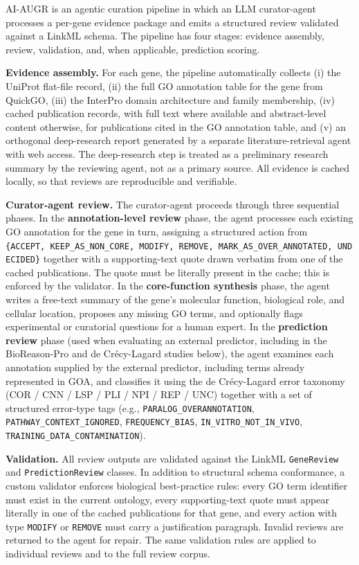 \documentclass[
  11pt,
]{article}
\begin{document}
AI-AUGR is an agentic curation pipeline in which an LLM curator-agent
processes a per-gene evidence package and emits a structured review
validated against a LinkML schema. The pipeline has four stages:
evidence assembly, review, validation, and, when applicable, prediction
scoring.

\textbf{Evidence assembly.} For each gene, the pipeline automatically
collects (i) the UniProt flat-file record, (ii) the full GO annotation
table for the gene from QuickGO, (iii) the InterPro domain architecture
and family membership, (iv) cached publication records, with full text
where available and abstract-level content otherwise, for publications
cited in the GO annotation table, and (v) an orthogonal
deep-research report generated by a separate literature-retrieval agent
with web access. The deep-research step is treated as a preliminary
research summary by the reviewing agent, not as a primary source. All
evidence is cached locally, so that reviews are reproducible and
verifiable.

\textbf{Curator-agent review.} The curator-agent proceeds through three
sequential phases. In the \textbf{annotation-level review} phase, the
agent processes each existing GO annotation for the gene in turn,
assigning a structured action from
\texttt{\{ACCEPT,\ KEEP\_AS\_NON\_CORE,\ MODIFY,\ REMOVE,\ MARK\_AS\_OVER\_ANNOTATED,\ UNDECIDED\}}
together with a supporting-text quote drawn verbatim from one of the
cached publications. The quote must be literally present in the cache;
this is enforced by the validator. In the \textbf{core-function
synthesis} phase, the agent writes a free-text summary of the gene's
molecular function, biological role, and cellular location, proposes any
missing GO terms, and optionally flags experimental or curatorial
questions for a human expert. In the \textbf{prediction review} phase
(used when evaluating an external predictor, including in the
BioReason-Pro and de Crécy-Lagard studies below), the agent examines
each annotation supplied by the external predictor, including terms
already represented in GOA, and
classifies it using the de Crécy-Lagard error taxonomy (COR / CNN / LSP
/ PLI / NPI / REP / UNC) together with a set of structured error-type
tags (e.g., \texttt{PARALOG\_OVERANNOTATION},
\texttt{PATHWAY\_CONTEXT\_IGNORED}, \texttt{FREQUENCY\_BIAS},
\texttt{IN\_VITRO\_NOT\_IN\_VIVO},
\texttt{TRAINING\_DATA\_CONTAMINATION}).

\textbf{Validation.} All review outputs are validated against the LinkML
\texttt{GeneReview} and \texttt{PredictionReview} classes. In addition
to structural schema conformance, a custom validator enforces biological
best-practice rules: every GO term identifier must exist in the current
ontology, every supporting-text quote must appear literally in one of
the cached publications for that gene, and every action with type
\texttt{MODIFY} or \texttt{REMOVE} must carry a justification paragraph.
Invalid reviews are returned to the agent for repair. The same
validation rules are applied to individual reviews and to the full
review corpus.
\end{document}
